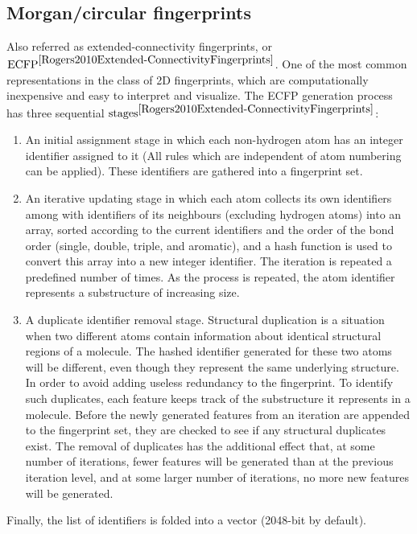 \subsection{Morgan/circular fingerprints}
Also referred as extended-connectivity fingerprints, or $\text{ECFP}^{\cite{Rogers2010Extended-ConnectivityFingerprints}}$.
One of the most common representations in the class of 2D fingerprints, which are computationally inexpensive and easy to interpret and visualize.
The ECFP generation process has three sequential $\text{stages}^{\cite{Rogers2010Extended-ConnectivityFingerprints}}$:
\begin{enumerate}
    \item An initial assignment stage in which each non-hydrogen atom has an integer identifier assigned to it (All rules which are independent of atom numbering can be applied).
    These identifiers are gathered into a fingerprint set. 
    \item An iterative updating stage in which each atom collects its own identifiers among with identifiers of its neighbours (excluding hydrogen atoms) into an array, sorted according to the current identifiers and the order of the bond order (single, double, triple, and aromatic), and a hash function is used to convert this array into a new integer identifier.
    The iteration is repeated a predefined number of times. As the process is repeated, the atom identifier represents a
    substructure of increasing size.
    \item A duplicate identifier removal stage. Structural duplication is a situation when two different atoms contain information about identical structural regions of a molecule.
    The hashed identifier generated for these two atoms will be different, even though they represent the same underlying structure.
    In order to avoid adding useless redundancy to the fingerprint.
    To identify such duplicates, each feature keeps track of the substructure it represents in a molecule.
    Before the newly generated features from an iteration are appended to the fingerprint set, they are checked to see if any structural duplicates exist.
    The removal of duplicates has the additional effect that, at some number of iterations, fewer features will be generated than at the previous iteration level, and at some larger number of iterations, no more new features will be generated.
\end{enumerate}
    Finally, the list of identifiers is folded into a vector (2048-bit by default).
\hfill\break\\
